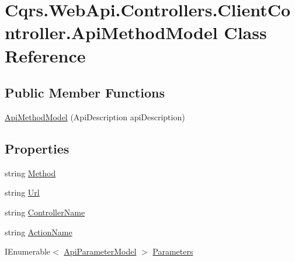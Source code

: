 \hypertarget{classCqrs_1_1WebApi_1_1Controllers_1_1ClientController_1_1ApiMethodModel}{}\section{Cqrs.\+Web\+Api.\+Controllers.\+Client\+Controller.\+Api\+Method\+Model Class Reference}
\label{classCqrs_1_1WebApi_1_1Controllers_1_1ClientController_1_1ApiMethodModel}
\subsection*{Public Member Functions}
\begin{DoxyCompactItemize}
\item 
\hyperlink{classCqrs_1_1WebApi_1_1Controllers_1_1ClientController_1_1ApiMethodModel_a6d1bf1c1016565c5ca50c6591dc7f9c1_a6d1bf1c1016565c5ca50c6591dc7f9c1}{Api\+Method\+Model} (Api\+Description api\+Description)
\end{DoxyCompactItemize}
\subsection*{Properties}
\begin{DoxyCompactItemize}
\item 
string \hyperlink{classCqrs_1_1WebApi_1_1Controllers_1_1ClientController_1_1ApiMethodModel_ae5e755bb50395fb205f2fef1e0996c9c_ae5e755bb50395fb205f2fef1e0996c9c}{Method}
\item 
string \hyperlink{classCqrs_1_1WebApi_1_1Controllers_1_1ClientController_1_1ApiMethodModel_acc052a6baebad1db57f1cae2dcc79261_acc052a6baebad1db57f1cae2dcc79261}{Url}
\item 
string \hyperlink{classCqrs_1_1WebApi_1_1Controllers_1_1ClientController_1_1ApiMethodModel_a3d87deeca069fb2c77a65d7f554e8a53_a3d87deeca069fb2c77a65d7f554e8a53}{Controller\+Name}
\item 
string \hyperlink{classCqrs_1_1WebApi_1_1Controllers_1_1ClientController_1_1ApiMethodModel_a9c87230b81015b0c331f1a7177ff23d2_a9c87230b81015b0c331f1a7177ff23d2}{Action\+Name}
\item 
I\+Enumerable$<$ \hyperlink{classCqrs_1_1WebApi_1_1Controllers_1_1ClientController_1_1ApiParameterModel}{Api\+Parameter\+Model} $>$ \hyperlink{classCqrs_1_1WebApi_1_1Controllers_1_1ClientController_1_1ApiMethodModel_a0da38a890013a8363ae1a2361de1c45b_a0da38a890013a8363ae1a2361de1c45b}{Parameters}
\end{DoxyCompactItemize}


